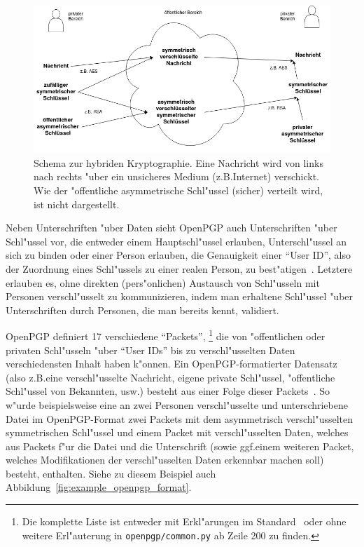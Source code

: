 \documentclass[12pt]{article}
\begin{document}
\begin{figure}
    \includegraphics[width=\textwidth]{hybrid.png}
    \caption{Schema zur hybriden Kryptographie.
    Eine Nachricht wird von links nach rechts "uber ein unsicheres Medium (z.B.\@ Internet) verschickt.
    Wie der "offentliche asymmetrische Schl"ussel (sicher) verteilt wird, ist nicht dargestellt.}
    \label{fig:hybrid_crypto}
\end{figure}

Neben Unterschriften "uber Daten sieht OpenPGP auch Unterschriften "uber Schl"us\-sel vor,
die entweder einem Hauptschl"ussel erlauben, Unterschl"ussel an sich zu binden oder
einer Person erlauben, die Genauigkeit einer "`User ID"', also der Zuordnung eines Schl"ussels
zu einer realen Person, zu best"atigen~\cite{rfc4480}.
Letztere erlauben es, ohne direkten (pers"onlichen) Austausch von Schl"usseln mit Personen
ver\-schl"us\-selt zu kommunizieren, indem man erhaltene Schl"ussel "uber Unterschriften
durch Personen, die man bereits kennt, validiert.

OpenPGP definiert 17 verschiedene "`Packets"',%
\footnote{Die komplette Liste ist entweder mit Erkl"arungen im Standard~\cite{rfc4480}
oder ohne weitere Erl"auterung in \texttt{openpgp/common.py} ab Zeile 200 zu finden.}
die von "offentlichen oder privaten Schl"usseln "uber
"`User IDs"' bis zu verschl"usselten Daten verschiedensten Inhalt haben k"onnen.
Ein OpenPGP-formatierter Datensatz (also z.B.\@ eine verschl"usselte Nachricht, eigene private Schl"ussel,
"offentliche Schl"ussel von Bekannten, usw.\@) be\-steht aus einer Folge dieser Packets~\cite{rfc4480}.
So w"urde beispielsweise eine an zwei Personen verschl"usselte und unterschriebene Datei im OpenPGP-Format
zwei Packets mit dem asymmetrisch verschl"usselten symmetrischen Schl"ussel und einem Packet mit
verschl"usselten Daten, welches aus Packets f"ur die Datei und die Unterschrift
(sowie ggf.\@ einem weiteren Packet, welches Modifikationen der verschl"usselten Daten erkennbar machen soll)
besteht, enthalten.
Siehe zu diesem Beispiel auch Abbildung~\ref{fig:example_openpgp_format}.
\end{document}
